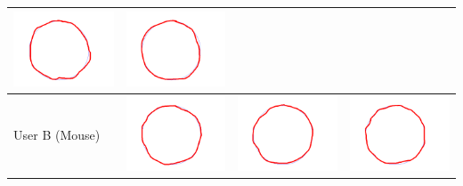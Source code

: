 \begin{tabular}{lccc}
\includegraphics[width=3cm]{fig_exp/circle_Ayaka_test3_1_m.png} &
\includegraphics[width=3cm]{fig_exp/circle_Ayaka_test3_2_m.png} \\
\midrule
 User B (Mouse)&
\includegraphics[width=3cm]{fig_exp/circle_Angus_test3_0_m.png} &
\includegraphics[width=3cm]{fig_exp/circle_Angus_test3_1_m.png} &
\includegraphics[width=3cm]{fig_exp/circle_Angus_test3_2_m.png} \\
\bottomrule
\end{tabular}

